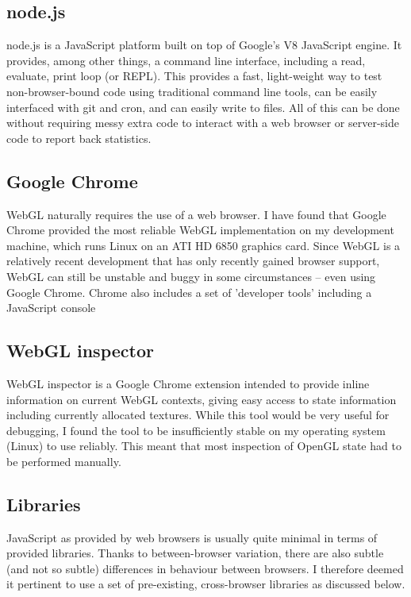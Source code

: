 \documentclass[12pt,twoside,notitlepage]{report}
\begin{document}
\subsection*{node.js}
node.js is a JavaScript platform built on top of Google's V8 JavaScript engine\cite{v8}. It provides, among other things, a command line interface, including a read, evaluate, print loop (or REPL). This provides a fast, light-weight way to test non-browser-bound code using traditional command line tools, can be easily interfaced with git and cron, and can easily write to files. All of this can be done without requiring messy extra code to interact with a web browser or server-side code to report back statistics.

\subsection*{Google Chrome}
WebGL naturally requires the use of a web browser. I have found that Google Chrome provided the most reliable WebGL implementation on my development machine, which runs Linux on an ATI HD 6850 graphics card. Since {WebGL} is a relatively recent development that has only recently gained browser support, WebGL can still be unstable and buggy in some circumstances -- even using Google Chrome. Chrome also includes a set of 'developer tools' including a JavaScript console 

\subsection*{WebGL inspector}
WebGL inspector is a Google Chrome extension intended to provide inline information on current WebGL contexts, giving easy access to state information including currently allocated textures. While this tool would be very useful for debugging, I found the tool to be insufficiently stable on my operating system (Linux) to use reliably. This meant that most inspection of OpenGL state had to be performed manually.

\subsection{Libraries}
JavaScript as provided by web browsers is usually quite minimal in terms of provided libraries. Thanks to between-browser variation, there are also subtle (and not so subtle) differences in behaviour between browsers. I therefore deemed it pertinent to use a set of pre-existing, cross-browser libraries as discussed below. 
\end{document}
